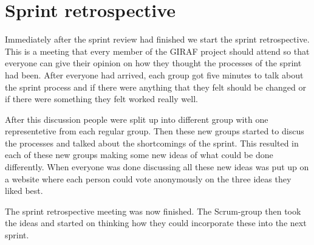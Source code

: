 \section{Sprint retrospective}

Immediately after the sprint review had finished we start the sprint retrospective. 
This is a meeting that every member of the GIRAF project should attend so that everyone can give their opinion on how they thought the processes of the sprint had been.
After everyone had arrived, each group got five minutes to talk about the sprint process and if there were anything that they felt should be changed or if there were something they felt worked really well.

After this discussion people were split up into different group with one representetive from each regular group. 
Then these new groups started to discus the processes and talked about the shortcomings of the sprint. 
This resulted in each  of these new groups making some new ideas of what could be done differently.
When everyone was done discussing all these new ideas was put up on a website where each person could vote anonymously on the three ideas they liked best.

The sprint retrospective meeting was now finished. 
The Scrum-group then took the ideas and started on thinking how they could incorporate these into the next sprint.